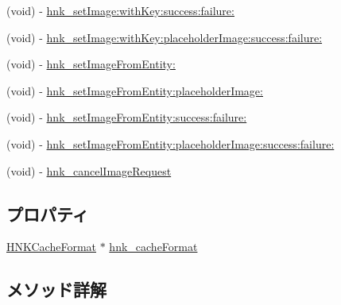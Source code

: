 \begin{DoxyCompactItemize}
(void) -\/ \hyperlink{category_u_i_image_view_07_haneke_08_a9549bff4f3b99f97069b62b83705a71a}{hnk\+\_\+set\+Image\+:with\+Key\+:success\+:failure\+:}
\item 
(void) -\/ \hyperlink{category_u_i_image_view_07_haneke_08_af566332aa2f9ab984ba1c33f578c87cb}{hnk\+\_\+set\+Image\+:with\+Key\+:placeholder\+Image\+:success\+:failure\+:}
\item 
(void) -\/ \hyperlink{category_u_i_image_view_07_haneke_08_a0d0ec7d3a5451435be43b2fbd9564701}{hnk\+\_\+set\+Image\+From\+Entity\+:}
\item 
(void) -\/ \hyperlink{category_u_i_image_view_07_haneke_08_a8ff8dad3bb4fbe797f71265d360d5bb1}{hnk\+\_\+set\+Image\+From\+Entity\+:placeholder\+Image\+:}
\item 
(void) -\/ \hyperlink{category_u_i_image_view_07_haneke_08_a885c8cecd517fbf4d30efced83a3d3ce}{hnk\+\_\+set\+Image\+From\+Entity\+:success\+:failure\+:}
\item 
(void) -\/ \hyperlink{category_u_i_image_view_07_haneke_08_af3cbb47f086a2d2627f4e6b4733cffe0}{hnk\+\_\+set\+Image\+From\+Entity\+:placeholder\+Image\+:success\+:failure\+:}
\item 
(void) -\/ \hyperlink{category_u_i_image_view_07_haneke_08_a018e6c9790200a4febb6256b4c733204}{hnk\+\_\+cancel\+Image\+Request}
\end{DoxyCompactItemize}
\subsection*{プロパティ}
\begin{DoxyCompactItemize}
\item 
\hyperlink{interface_h_n_k_cache_format}{H\+N\+K\+Cache\+Format} $\ast$ \hyperlink{category_u_i_image_view_07_haneke_08_ada173373a722ce388464d8c807d12a32}{hnk\+\_\+cache\+Format}
\end{DoxyCompactItemize}


\subsection{メソッド詳解}
\hypertarget{category_u_i_image_view_07_haneke_08_a018e6c9790200a4febb6256b4c733204}{}
